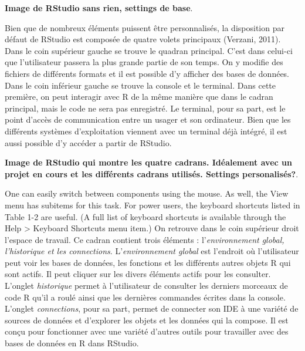\documentclass[
  letterpaper,
]{scrbook}
\begin{document}
\textbf{Image de RStudio sans rien, settings de base}.

Bien que de nombreux éléments puissent être personnalisés, la
disposition par défaut de RStudio est composée de quatre volets
principaux (Verzani, 2011). Dans le coin supérieur gauche se trouve le
quadran principal. C'est dans celui-ci que l'utilisateur passera la plus
grande partie de son temps. On y modifie des fichiers de différents
formats et il est possible d'y afficher des bases de données. Dans le
coin inférieur gauche se trouve la console et le terminal. Dans cette
première, on peut interagir avec R de la même manière que dans le cadran
principal, mais le code ne sera pas enregistré. Le terminal, pour sa
part, est le point d'accès de communication entre un usager et son
ordinateur. Bien que les différents systèmes d'exploitation viennent
avec un terminal déjà intégré, il est aussi possible d'y accéder a
partir de RStudio.

\textbf{Image de RStudio qui montre les quatre cadrans. Idéalement avec
un projet en cours et les différents cadrans utilisés. Settings
personalisés?}.

One can easily switch between components using the mouse. As well, the
View menu has subitems for this task. For power users, the keyboard
shortcuts listed in Table 1-2 are useful. (A full list of keyboard
shortcuts is available through the Help \textgreater{} Keyboard
Shortcuts menu item.) On retrouve dans le coin supérieur droit l'espace
de travail. Ce cadran contient trois éléments : l'\emph{environnement
global, l'historique et les connections}. L'\emph{environnement global}
est l'endroit où l'utilisateur peut voir les bases de données, les
fonctions et les différents autres objets R qui sont actifs. Il peut
cliquer sur les divers éléments actifs pour les consulter. L'onglet
\emph{historique} permet à l'utilisateur de consulter les derniers
morceaux de code R qu'il a roulé ainsi que les dernières commandes
écrites dans la console. L'onglet \emph{connections}, pour sa part,
permet de connecter son IDE à une variété de sources de données et
d'explorer les objets et les données qui la compose. Il est conçu pour
fonctionner avec une variété d'autres outils pour travailler avec des
bases de données en R dans RStudio.
\end{document}
